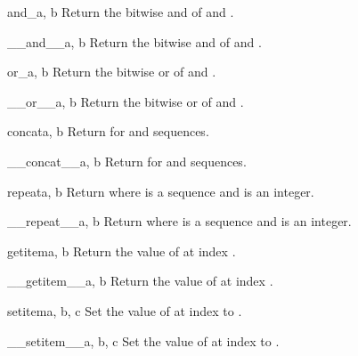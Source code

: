 \begin{funcdesc}{and_}{a, b}
Return the bitwise and of  and .
\end{funcdesc}

\begin{funcdesc}{__and__}{a, b}
Return the bitwise and of  and .
\end{funcdesc}

\begin{funcdesc}{or_}{a, b}
Return the bitwise or of  and .
\end{funcdesc}

\begin{funcdesc}{__or__}{a, b}
Return the bitwise or of  and .
\end{funcdesc}

\begin{funcdesc}{concat}{a, b}
Return  \code{+}  for  and  sequences.
\end{funcdesc}

\begin{funcdesc}{__concat__}{a, b}
Return  \code{+}  for  and  sequences.
\end{funcdesc}

\begin{funcdesc}{repeat}{a, b}
Return  \code{*}  where  is a sequence and
 is an integer.
\end{funcdesc}

\begin{funcdesc}{__repeat__}{a, b}
Return  \code{*}  where  is a sequence and
 is an integer.
\end{funcdesc}

\begin{funcdesc}{getitem}{a, b}
Return the value of  at index .
\end{funcdesc}

\begin{funcdesc}{__getitem__}{a, b}
Return the value of  at index .
\end{funcdesc}

\begin{funcdesc}{setitem}{a, b, c}
Set the value of  at index  to .
\end{funcdesc}

\begin{funcdesc}{__setitem__}{a, b, c}
Set the value of  at index  to .
\end{funcdesc}

